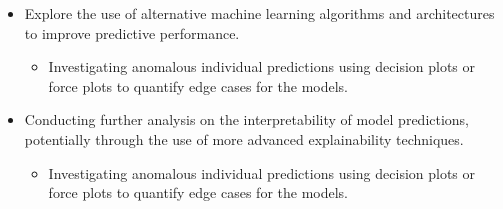 \begin{itemize}
    \item Explore the use of alternative machine learning algorithms and architectures to improve predictive performance.
    \begin{itemize}
        \item Investigating anomalous individual predictions using decision plots or force plots to quantify edge cases for the models.
    \end{itemize}
    \item Conducting further analysis on the interpretability of model predictions, potentially through the use of more advanced explainability techniques.
    \begin{itemize}
        \item Investigating anomalous individual predictions using decision plots or force plots to quantify edge cases for the models.
    \end{itemize}
\end{itemize}